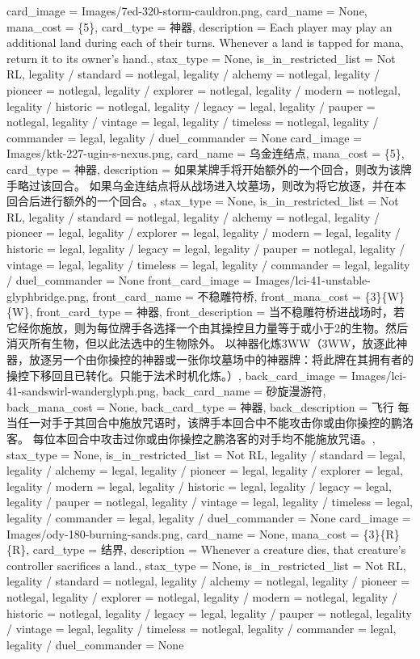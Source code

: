 \documentclass[lang = cn, color = black, 10pt]{AllThatStax}
\begin{document}
\card
{
	card_image = Images/7ed-320-storm-cauldron.png,
	card_name = None,
	mana_cost = \{5\},
	card_type = 神器,
	description = Each player may play an additional land during each of their turns.
	Whenever a land is tapped for mana, return it to its owner's hand.,
	stax_type = None,
	is_in_restricted_list = Not RL,
	legality / standard = notlegal,
	legality / alchemy = notlegal,
	legality / pioneer = notlegal,
	legality / explorer = notlegal,
	legality / modern = notlegal,
	legality / historic = notlegal,
	legality / legacy = legal,
	legality / pauper = notlegal,
	legality / vintage = legal,
	legality / timeless = notlegal,
	legality / commander = legal,
	legality / duel_commander = None
}
\card
{
	card_image = Images/ktk-227-ugin-s-nexus.png,
	card_name = 乌金连结点,
	mana_cost = \{5\},
	card_type = 神器,
	description = 如果某牌手将开始额外的一个回合，则改为该牌手略过该回合。
	如果乌金连结点将从战场进入坟墓场，则改为将它放逐，并在本回合后进行额外的一个回合。,
	stax_type = None,
	is_in_restricted_list = Not RL,
	legality / standard = notlegal,
	legality / alchemy = notlegal,
	legality / pioneer = legal,
	legality / explorer = legal,
	legality / modern = legal,
	legality / historic = legal,
	legality / legacy = legal,
	legality / pauper = notlegal,
	legality / vintage = legal,
	legality / timeless = legal,
	legality / commander = legal,
	legality / duel_commander = None
}
\mfcard
{
	front_card_image = Images/lci-41-unstable-glyphbridge.png,
	front_card_name = 不稳雕符桥,
	front_mana_cost = \{3\}\{W\}\{W\},
	front_card_type = 神器,
	front_description = 当不稳雕符桥进战场时，若它经你施放，则为每位牌手各选择一个由其操控且力量等于或小于2的生物。然后消灭所有生物，但以此法选中的生物除外。
	以神器化炼{3}{W}{W}（{3}{W}{W}，放逐此神器，放逐另一个由你操控的神器或一张你坟墓场中的神器牌：将此牌在其拥有者的操控下移回且已转化。只能于法术时机化炼。）,
	back_card_image = Images/lci-41-sandswirl-wanderglyph.png,
	back_card_name = 砂旋漫游符,
	back_mana_cost = None,
	back_card_type = 神器,
	back_description = 飞行
	每当任一对手于其回合中施放咒语时，该牌手本回合中不能攻击你或由你操控的鹏洛客。
	每位本回合中攻击过你或由你操控之鹏洛客的对手均不能施放咒语。,
	stax_type = None,
	is_in_restricted_list = Not RL,
	legality / standard = legal,
	legality / alchemy = legal,
	legality / pioneer = legal,
	legality / explorer = legal,
	legality / modern = legal,
	legality / historic = legal,
	legality / legacy = legal,
	legality / pauper = notlegal,
	legality / vintage = legal,
	legality / timeless = legal,
	legality / commander = legal,
	legality / duel_commander = None
}
\card
{
	card_image = Images/ody-180-burning-sands.png,
	card_name = None,
	mana_cost = \{3\}\{R\}\{R\},
	card_type = 结界,
	description = Whenever a creature dies, that creature's controller sacrifices a land.,
	stax_type = None,
	is_in_restricted_list = Not RL,
	legality / standard = notlegal,
	legality / alchemy = notlegal,
	legality / pioneer = notlegal,
	legality / explorer = notlegal,
	legality / modern = notlegal,
	legality / historic = notlegal,
	legality / legacy = legal,
	legality / pauper = notlegal,
	legality / vintage = legal,
	legality / timeless = notlegal,
	legality / commander = legal,
	legality / duel_commander = None
}
\end{document}
